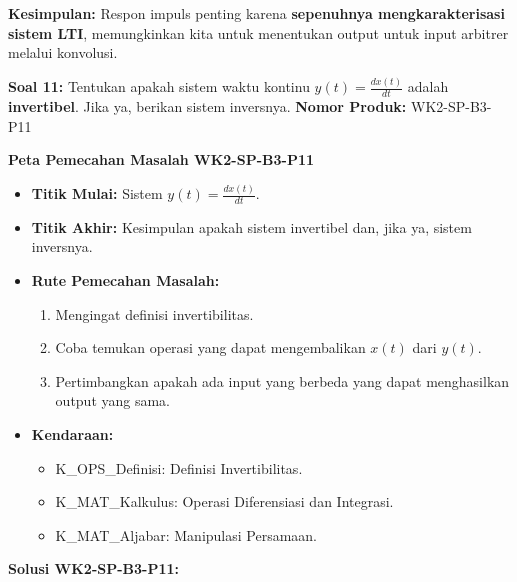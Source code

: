 \documentclass[
  letterpaper,
  DIV=11,
  numbers=noendperiod]{scrreprt}
\providecommand{\tightlist}{%
  \setlength{\itemsep}{0pt}\setlength{\parskip}{0pt}}
\begin{document}
\textbf{Kesimpulan:} Respon impuls penting karena \textbf{sepenuhnya
mengkarakterisasi sistem LTI}, memungkinkan kita untuk menentukan output
untuk input arbitrer melalui konvolusi.

\textbf{Soal 11:} Tentukan apakah sistem waktu kontinu
\(y(t) = \frac{dx(t)}{dt}\) adalah \textbf{invertibel}. Jika ya, berikan
sistem inversnya. \textbf{Nomor Produk:} WK2-SP-B3-P11

\textbf{Peta Pemecahan Masalah WK2-SP-B3-P11}

\begin{itemize}
\tightlist
\item
  \textbf{Titik Mulai:} Sistem \(y(t) = \frac{dx(t)}{dt}\).
\item
  \textbf{Titik Akhir:} Kesimpulan apakah sistem invertibel dan, jika
  ya, sistem inversnya.
\item
  \textbf{Rute Pemecahan Masalah:}

  \begin{enumerate}
  \def\labelenumi{\arabic{enumi}.}
  \tightlist
  \item
    Mengingat definisi invertibilitas.
  \item
    Coba temukan operasi yang dapat mengembalikan \(x(t)\) dari
    \(y(t)\).
  \item
    Pertimbangkan apakah ada input yang berbeda yang dapat menghasilkan
    output yang sama.
  \end{enumerate}
\item
  \textbf{Kendaraan:}

  \begin{itemize}
  \tightlist
  \item
    K\_OPS\_Definisi: Definisi Invertibilitas.
  \item
    K\_MAT\_Kalkulus: Operasi Diferensiasi dan Integrasi.
  \item
    K\_MAT\_Aljabar: Manipulasi Persamaan.
  \end{itemize}
\end{itemize}

\textbf{Solusi WK2-SP-B3-P11:}
\end{document}
